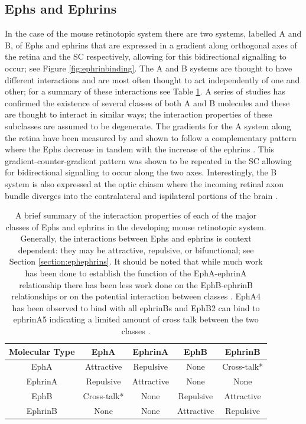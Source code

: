 \subsection{Ephs and Ephrins}
In the case of the mouse retinotopic system there are two systems, labelled A and B, of Ephs and ephrins that are expressed in a gradient along orthogonal axes of the retina and the SC respectively, allowing for this bidirectional signalling to occur; see Figure \ref{fig:ephrinbinding}. The A and B systems are thought to have different interactions and are most often thought to act independently of one and other; for a summary of these interactions see Table \ref{table:ephephriniteraction}. A series of studies has confirmed the existence of several classes of both A and B molecules and these are thought to interact in similar ways; the interaction properties of these subclasses are assumed to be degenerate. The gradients for the A system along the retina have been measured by and shown to follow a complementary pattern where the Ephs decrease in tandem with the increase of the ephrins \cite{Reber2004-wq}. This gradient-counter-gradient pattern was shown to be repeated in the SC allowing for bidirectional signalling to occur along the two axes. Interestingly, the B system is also expressed at the optic chiasm where the incoming retinal axon bundle diverges into the contralateral and ispilateral portions of the brain \cite{McLaughlin2003-co}.
\begin{table}
	\centering
	\begin{tabular}{|c|c c c c|}
		\hline
		\textbf{Molecular Type} & EphA & EphrinA & EphB & EphrinB \\
		\hline
		EphA & Attractive & Repulsive & None & Cross-talk* \\
		EphrinA & Repulsive & Attractive & None & None \\
		EphB & Cross-talk* & None & Repulsive & Attractive \\
		EphrinB & None & None & Attractive & Repulsive \\
		\hline
	\end{tabular}
	\def\c{A brief summary of the interaction properties of each of the major classes of Ephs and ephrins in the developing mouse retinotopic system. }
	\caption[\c]{\c Generally, the interactions between Ephs and ephrins is context dependent: they may be attractive, repulsive, or bifunctional; see Section \ref{section:ephephrins}. It should be noted that while much work has been done to establish the function of the EphA-ephrinA relationship there has been less work done on the EphB-ephrinB relationships or on the potential interaction between classes \cite{Lemke2005-iz}. EphA4 has been observed to bind with all ephrinBs and EphB2 can bind to ephrinA5 indicating a limited amount of cross talk between the two classes \cite{Gale1996-zd, Himanen2004-jj}. \label{table:ephephriniteraction}}
\end{table}
